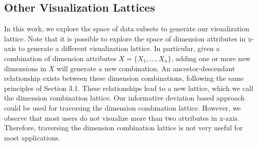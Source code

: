 \subsection{Other Visualization Lattices}
In this work, we explore the space of data subsets to generate our visualization lattice. Note that it is possible to explore the space of dimension attributes in x-axis to generate a different visualization lattice. In particular, given a combination of dimension attributes $X = \{X_1, \ldots, X_n\}$, adding one or more new dimensions in $X$ will generate a new combination. An ancestor-descendant relationship exists between these dimension combinations, following the same principles of Section 3.1. These relationships lead to a new lattice, which we call the dimension combination lattice. Our informative deviation based approach could be used for traversing the dimension combination lattice. However, we observe that most users do not visualize more than two attributes in x-axis. Therefore, traversing the dimension combination lattice is not very useful for most applications.




